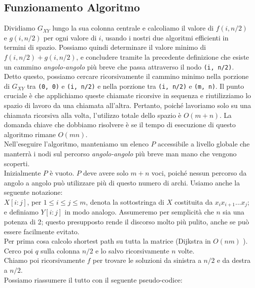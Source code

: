 \subsection{Funzionamento Algoritmo}

Dividiamo $G_{XY}$ lungo la sua colonna centrale e calcoliamo il
valore di $f(i, n/2)$ e $g(i, n/2)$ per ogni valore di $i$, usando
i nostri due algoritmi efficienti in termini di spazio. Possiamo quindi
determinare il valore minimo di $f(i, n/2) + g(i, n/2)$, e concludere
tramite la precedente definizione che esiste un cammino
\emph{angolo-angolo} più breve che passa attraverso il nodo
\texttt{(i,\ n/2)}. Detto questo, possiamo cercare ricorsivamente il
cammino minimo nella porzione di $G_{XY}$ tra \texttt{(0,\ 0)} e
\texttt{(i,\ n/2)} e nella porzione tra \texttt{(i,\ n/2)} e
\texttt{(m,\ n)}. Il punto cruciale è che applichiamo queste chiamate
ricorsive in sequenza e riutilizziamo lo spazio di lavoro da una
chiamata all'altra. Pertanto, poiché lavoriamo solo su una chiamata
ricorsiva alla volta, l'utilizzo totale dello spazio è $O(m + n)$. La
domanda chiave che dobbiamo risolvere è se il tempo di esecuzione di
questo algoritmo rimane $O(mn)$.\\ Nell'eseguire l'algoritmo, manteniamo
un elenco $P$ accessibile a livello globale che manterrà i nodi sul
percorso \emph{angolo-angolo} più breve man mano che vengono scoperti.\\
Inizialmente $P$ è vuoto. $P$ deve avere solo $m + n$ voci, poiché
nessun percorso da angolo a angolo può utilizzare più di questo numero
di archi. Usiamo anche la seguente notazione:\\ $X[i : j]$, per
$1 \le i \le j \le m$, denota la sottostringa di $X$ costituita da
$x_i x_{i+1} ... x_j$;\\ e definiamo $Y[i : j]$ in modo analogo.
Assumeremo per semplicità che $n$ sia una potenza di 2; questo
presupposto rende il discorso molto più pulito, anche se può essere
facilmente evitato.\\

Per prima cosa calcolo shortest path su tutta la matrice (Dijkstra in
$O(nm)$ ). Cerco poi $q$ sulla colonna $n/2$ e lo salvo
ricorsivamente $n$ volte.\\ Chiamo poi ricorsivamente $f$ per trovare
le soluzioni da sinistra a $n/2$ e da destra a $n/2$.\\

Possiamo riassumere il tutto con il seguente pseudo-codice:


